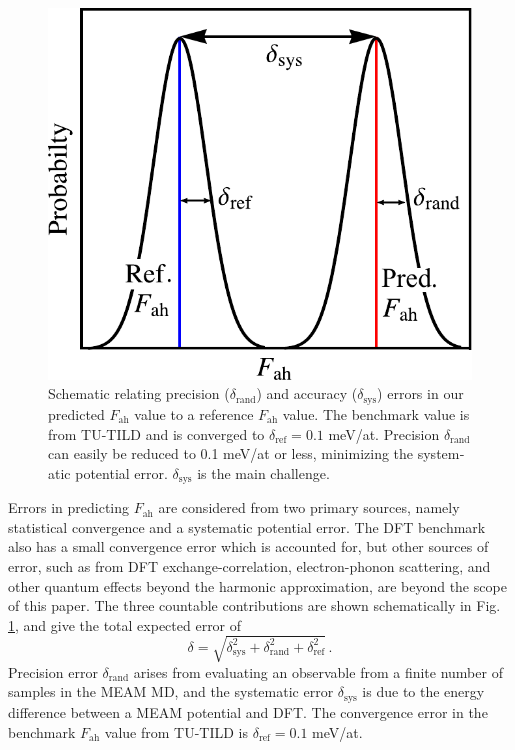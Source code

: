 \documentclass[twocolumn,american,aps,prb,showpacs,showkeys,amsmath,amssymb,superscriptaddress,a4]{revtex4-1}
\begin{document}
\begin{center}
\begin{figure}[H]
\begin{centering}
\includegraphics[scale=0.60]{Fig3_accuracy-preicision}
\par\end{centering}
\caption{\foreignlanguage{american}{Schematic relating precision ($\delta_{\text{rand}}$) and accuracy
($\delta_{\text{sys}}$) errors in our predicted $F_{\text{ah}}$ value
to a reference $F_{\text{ah}}$ value. The benchmark value is from
TU-TILD\cite{Duff2015} and is converged to $\delta_{\text{ref}}=0.1$
meV/at. Precision $\delta_{\text{rand}}$ can easily be reduced to
0.1 meV/at or less, minimizing the systematic potential error. $\delta_{\text{sys}}$
is the main challenge. \label{fig: accuracy-preicision}}}
\end{figure}
\par\end{center}

Errors in  predicting $F_{\text{ah}}$ are considered from two
primary sources, namely statistical convergence and a systematic potential
error. The DFT benchmark also has a small convergence error which
is accounted for, but other sources of error, such as from DFT exchange-correlation, electron-phonon scattering, and other quantum effects beyond
the harmonic approximation, are beyond the scope of this paper. The
three countable contributions are shown schematically in Fig. \ref{fig: accuracy-preicision},
and give the total expected error of
\begin{equation}
\delta=\sqrt{\delta_{\text{sys}}^{2}+\delta_{\text{rand}}^{2}+\delta_{\text{ref}}^{2}}\,.
\label{eq: errorQuadrature}
\end{equation}
Precision error $\delta_{\text{rand}}$ arises from evaluating an
observable from a finite number of samples in the MEAM MD, and the
systematic error $\delta_{\text{sys}}$ is due to the energy difference
between a MEAM potential and DFT. The convergence error in the benchmark
$F_{\text{ah}}$ value from TU-TILD is $\delta_{\text{ref}}=0.1$
meV/at.\cite{Duff2015}
\end{document}
